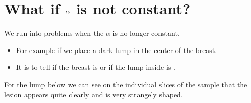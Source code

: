 \documentclass[letterpaper,10pt,english]{sphinxmanual}
\begin{document}
\section{What if \protect\(\alpha\protect\) is not constant?}
\label{\detokenize{04-BasicSegmentation:what-if-alpha-is-not-constant}}
\sphinxAtStartPar
We run into problems when the \(\alpha\) is no longer constant.
\begin{itemize}
\item {} 
\sphinxAtStartPar
For example if we place a dark lump in the center of the breast.

\item {} 
\sphinxAtStartPar
It is  to tell if the breast is  or if the lump inside is .

\end{itemize}

\sphinxAtStartPar
For the lump below we can see on the individual slices of the sample that the lesion appears quite clearly and is very strangely shaped.
\end{document}
